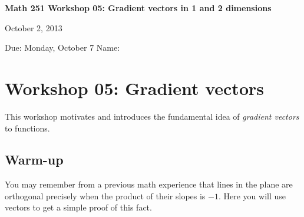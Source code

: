 \documentclass[12pt]{exam}
\theoremstyle{definition}
\begin{document}
\lstset{language=R}
\noindent
\textbf{{\large Math 251 \hfill Workshop 05: Gradient vectors in 1 and 2 dimensions}}

\noindent
October 2, 2013 

\noindent
Due: Monday, October 7 \hfill Name: \underline{\hspace{3in}} 

\noindent

\newtheorem{fact}{Fact}

\section{Workshop 05: Gradient vectors}

This workshop motivates and introduces the fundamental idea of
\emph{gradient vectors} to functions.

\subsection{Warm-up}

You may remember from a previous math experience that lines in the plane
are orthogonal precisely when the product of their slopes is $-1$. Here
you will use vectors to get a simple proof of this fact.
\end{document}
